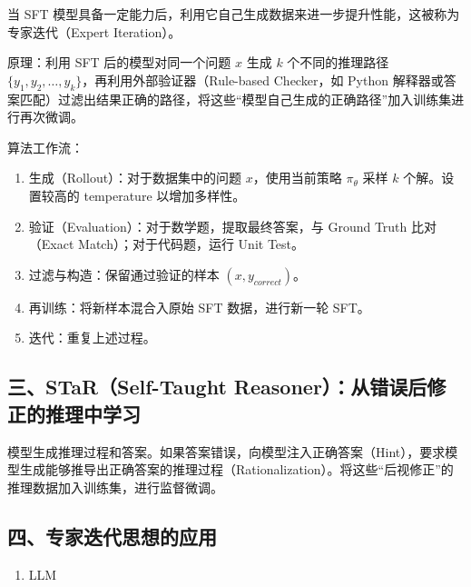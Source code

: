 当 SFT 模型具备一定能力后，利用它自己生成数据来进一步提升性能，这被称为专家迭代（Expert Iteration）。

原理：利用 SFT 后的模型对同一个问题 \(x\) 生成 \(k\) 个不同的推理路径 \(\{y_1,y_2,\ldots,y_k\}\)，再利用外部验证器（Rule-based Checker，如 Python 解释器或答案匹配）过滤出结果正确的路径，将这些``模型自己生成的正确路径''加入训练集进行再次微调。

算法工作流：

\begin{enumerate}
\def\labelenumi{\arabic{enumi}.}
\tightlist
\item
  生成（Rollout）：对于数据集中的问题 \(x\)，使用当前策略 \(\pi_\theta\) 采样 \(k\) 个解。设置较高的 temperature 以增加多样性。
\item
  验证（Evaluation）：对于数学题，提取最终答案，与 Ground Truth 比对（Exact Match）；对于代码题，运行 Unit Test。
\item
  过滤与构造：保留通过验证的样本 \((x,y_{correct})\)。
\item
  再训练：将新样本混合入原始 SFT 数据，进行新一轮 SFT。
\item
  迭代：重复上述过程。
\end{enumerate}

\hypertarget{ux4e09starself-taught-reasonerux4eceux9519ux8befux540eux4feeux6b63ux7684ux63a8ux7406ux4e2dux5b66ux4e60}{%
\subsection{三、STaR（Self-Taught Reasoner）：从错误后修正的推理中学习}\label{ux4e09starself-taught-reasonerux4eceux9519ux8befux540eux4feeux6b63ux7684ux63a8ux7406ux4e2dux5b66ux4e60}}

模型生成推理过程和答案。如果答案错误，向模型注入正确答案（Hint），要求模型生成能够推导出正确答案的推理过程（Rationalization）。将这些``后视修正''的推理数据加入训练集，进行监督微调。

\hypertarget{ux56dbux4e13ux5bb6ux8fedux4ee3ux601dux60f3ux7684ux5e94ux7528}{%
\subsection{四、专家迭代思想的应用}\label{ux56dbux4e13ux5bb6ux8fedux4ee3ux601dux60f3ux7684ux5e94ux7528}}

\begin{enumerate}
\def\labelenumi{\arabic{enumi}.}
\tightlist
\item
  LLM
\end{enumerate}

